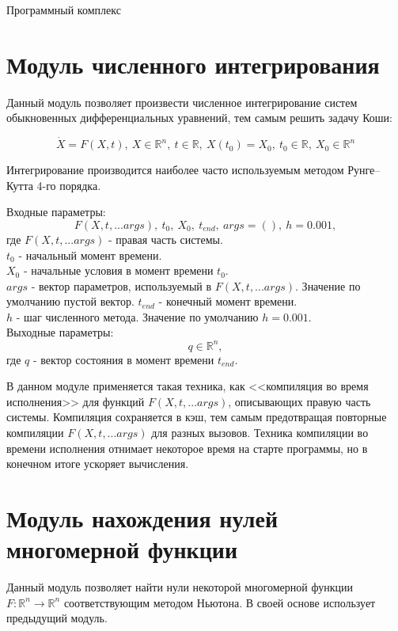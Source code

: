\begin{chapter}{Программный комплекс}
\section{Модуль численного интегрирования}
Данный модуль позволяет произвести численное интегрирование систем обыкновенных
дифференциальных уравнений, тем самым решить задачу Коши:

$$
\dot{X} = F(X, t), \ X \in \mathbb{R}^n, \ t \in \mathbb{R}, \ X(t_0) = X_0, \ t_0 \in \mathbb{R}, \ X_0 \in \mathbb{R}^n
$$

Интегрирование производится наиболее часто используемым методом Рунге--Кутта 4-го порядка.

Входные параметры: $$F(X, t, ...args), \ t_0, \ X_0,  \ t_{end}, \ args = (), \ h=0.001,$$
где $F(X, t, ...args)$ - правая часть системы. \\
$t_0$ - начальный момент времени. \\
$X_0$ - начальные условия в момент времени $t_0$. \\
$args$ - вектор параметров, используемый в $F(X, t, ...args)$. Значение по умолчанию пустой вектор.
$t_{end}$ - конечный момент времени. \\
$h$ - шаг численного метода. Значение по умолчанию $h = 0.001$. \\
Выходные параметры: $$ q \in \mathbb{R}^n,$$
где $q$ - вектор состояния в момент времени $t_{end}$.

В данном модуле применяется такая техника, как <<компиляция во время исполнения>>
для функций $F(X, t, ...args)$, описывающих правую часть системы. Компиляция сохраняется в кэш, тем
самым предотвращая повторные компиляции $F(X, t, ...args)$ для разных вызовов.
Техника компиляции во времени исполнения отнимает некоторое время на старте программы, но в конечном итоге ускоряет вычисления.

\section{Модуль нахождения нулей многомерной функции}
Данный модуль позволяет найти нули некоторой многомерной функции $F: \mathbb{R}^n \rightarrow \mathbb{R}^n$ соответствующим методом Ньютона.
В своей основе использует предыдущий модуль.


\end{chapter}
